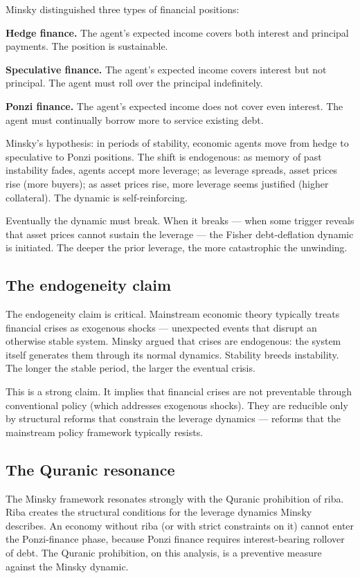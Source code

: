 Minsky distinguished three types of financial positions:

\textbf{Hedge finance.} The agent's expected income covers both
interest and principal payments. The position is sustainable.

\textbf{Speculative finance.} The agent's expected income covers
interest but not principal. The agent must roll over the
principal indefinitely.

\textbf{Ponzi finance.} The agent's expected income does not cover
even interest. The agent must continually borrow more to service
existing debt.

Minsky's hypothesis: in periods of stability, economic agents
move from hedge to speculative to Ponzi positions. The shift is
endogenous: as memory of past instability fades, agents accept
more leverage; as leverage spreads, asset prices rise (more
buyers); as asset prices rise, more leverage seems justified
(higher collateral). The dynamic is self-reinforcing.

Eventually the dynamic must break. When it breaks --- when some
trigger reveals that asset prices cannot sustain the leverage
--- the Fisher debt-deflation dynamic is initiated. The
deeper the prior leverage, the more catastrophic the unwinding.

\subsection{The endogeneity claim}

The endogeneity claim is critical. Mainstream economic theory
typically treats financial crises as exogenous shocks ---
unexpected events that disrupt an otherwise stable system.
Minsky argued that crises are endogenous: the system itself
generates them through its normal dynamics. Stability breeds
instability. The longer the stable period, the larger the
eventual crisis.

This is a strong claim. It implies that financial crises are not
preventable through conventional policy (which addresses
exogenous shocks). They are reducible only by structural reforms
that constrain the leverage dynamics --- reforms that the
mainstream policy framework typically resists.

\subsection{The Quranic resonance}

The Minsky framework resonates strongly with the Quranic
prohibition of riba. Riba creates the structural conditions for
the leverage dynamics Minsky describes. An economy without riba
(or with strict constraints on it) cannot enter the Ponzi-finance
phase, because Ponzi finance requires interest-bearing rollover
of debt. The Quranic prohibition, on this analysis, is a
preventive measure against the Minsky dynamic.

